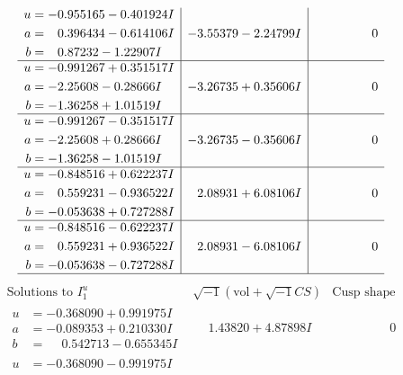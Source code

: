 \documentclass[1p]{elsarticle_modified}
\theoremstyle{definition}
\newcommand{\I}{\sqrt{-1}}
\begin{document}
$$\begin{array}{c|c|c}
\begin{aligned}
u &= -0.955165 - 0.401924 I \\
a &= \phantom{-}0.396434 - 0.614106 I \\
b &= \phantom{-}0.87232 - 1.22907 I\end{aligned}
 & -3.55379 - 2.24799 I & \phantom{-0.000000 } 0 \\ \hline\begin{aligned}
u &= -0.991267 + 0.351517 I \\
a &= -2.25608 - 0.28666 I \\
b &= -1.36258 + 1.01519 I\end{aligned}
 & -3.26735 + 0.35606 I & \phantom{-0.000000 } 0 \\ \hline\begin{aligned}
u &= -0.991267 - 0.351517 I \\
a &= -2.25608 + 0.28666 I \\
b &= -1.36258 - 1.01519 I\end{aligned}
 & -3.26735 - 0.35606 I & \phantom{-0.000000 } 0 \\ \hline\begin{aligned}
u &= -0.848516 + 0.622237 I \\
a &= \phantom{-}0.559231 - 0.936522 I \\
b &= -0.053638 + 0.727288 I\end{aligned}
 & \phantom{-}2.08931 + 6.08106 I & \phantom{-0.000000 } 0 \\ \hline\begin{aligned}
u &= -0.848516 - 0.622237 I \\
a &= \phantom{-}0.559231 + 0.936522 I \\
b &= -0.053638 - 0.727288 I\end{aligned}
 & \phantom{-}2.08931 - 6.08106 I & \phantom{-0.000000 } 0\\
 \hline 
 \end{array}$$\newpage$$\begin{array}{c|c|c}  
\text{Solutions to }I^u_{1}& \I (\text{vol} + \sqrt{-1}CS) & \text{Cusp shape}\\
 \hline 
\begin{aligned}
u &= -0.368090 + 0.991975 I \\
a &= -0.089353 + 0.210330 I \\
b &= \phantom{-}0.542713 - 0.655345 I\end{aligned}
 & \phantom{-}1.43820 + 4.87898 I & \phantom{-0.000000 } 0 \\ \hline\begin{aligned}
u &= -0.368090 - 0.991975 I \\

\end{aligned}
\end{array}$$
\end{document}
